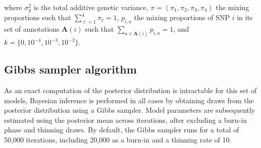 \documentclass{ol-softwaremanual}
\begin{document}
\begin{table}[h]
\end{table}

\noindent where $\sigma_g^2$ is the total additive genetic variance, $\pi=(\pi_1,\pi_2,\pi_3,\pi_4)$ the mixing proportions such that $\sum_{\ell=1}^4\pi_\ell=1$, $p_{i,a}$ the mixing proportions of SNP $i$ in its set of annotations $\mathbf{A}(i)$ such that $\sum_{a \in \mathbf{A}(i)}p_{i,a}=1$, and $k=\{0,10^{-4}, 10^{-3}, 10^{-2}\}$.

\subsection{Gibbs sampler algorithm}

As an exact computation of the posterior distribution is intractable for this set of models, Bayesian inference is performed in all cases by obtaining draws from the posterior distribution using a Gibbs sampler. Model parameters are subsequently estimated using the posterior mean across iterations, after excluding a burn-in phase and thinning draws. By default, the Gibbs sampler runs for a total of 50,000 iterations, including 20,000 as a burn-in and a thinning rate of 10.
\end{document}
